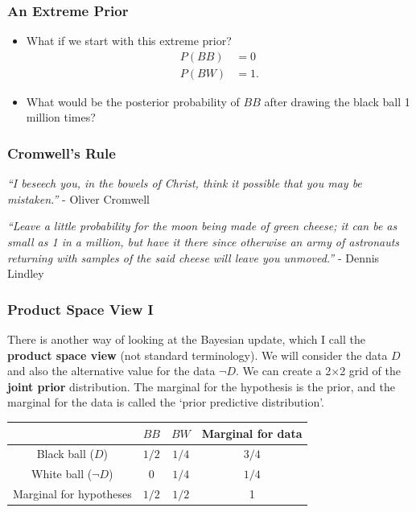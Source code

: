 \documentclass{beamer}
\begin{document}
\begin{frame}
\frametitle{An Extreme Prior}
\begin{itemize}
\item What if we start with this extreme prior?
\begin{align}
P(BB) &= 0 \\
P(BW) &= 1.
\end{align}

\item What would be the posterior probability of $BB$ after drawing the black
ball 1 million times?

\end{itemize}

\end{frame}



\begin{frame}
\frametitle{Cromwell's Rule}

{\em ``I beseech you, in the bowels of Christ, think it possible that
you may be mistaken.''} - Oliver Cromwell \\[1em]\pause

{\em ``Leave a little probability for the moon being made of green
cheese; it can be as small as 1 in a million, but have it
there since otherwise an army of astronauts returning
with samples of the said cheese will leave you unmoved.''}
- Dennis Lindley

\end{frame}


\begin{frame}
\frametitle{Product Space View I}
There is another way of looking at the Bayesian update, which I call the
{\bf product space view} (not standard terminology).
We will consider the data $D$ and also the alternative value for the data
$\neg D$. We can create a 2$\times$2 grid of the {\bf joint
prior} distribution. The marginal for the hypothesis is the prior,
and the marginal for the data is called the `prior predictive
distribution'.
\begin{center}
\begin{tabular}{|c|cc|c|}
\hline
   &  $BB$ &  $BW$ & Marginal for data\\
\hline
Black ball ($D$)      &  $1/2$  &  $1/4$     & $3/4$\\
White ball ($\neg D$) &  0      &  $1/4$     & $1/4$\\
\hline
Marginal for hypotheses   &  $1/2$  & $1/2$  & 1\\
\hline
\end{tabular}
\end{center}

\end{frame}
\end{document}

